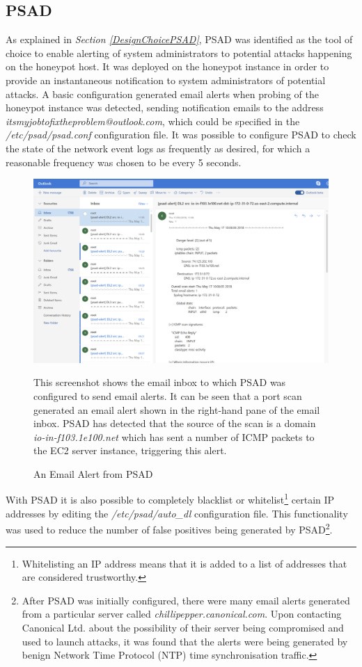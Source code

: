 \subsection{PSAD}
As explained in \textit{Section \ref{DesignChoicePSAD}}, PSAD was identified as the tool of choice to enable alerting of system administrators to potential attacks happening on the honeypot host. It was deployed on the honeypot instance in order to provide an instantaneous notification to system administrators of potential attacks. A basic configuration generated email alerts when probing of the honeypot instance was detected, sending notification emails to the address \textit{itsmyjobtofixtheproblem@outlook.com}, which could be specified in the \textit{/etc/psad/psad.conf} configuration file. It was possible to configure PSAD to check the state of the network event logs as frequently as desired, for which a reasonable frequency was chosen to be every 5 seconds.

\begin{figure}[ht]
      \centering
      \includegraphics[width=160mm, scale=1]{Images/psad-email-alert.PNG}
      \caption{An Email Alert from PSAD} 
      \medskip
      \small
		This screenshot shows the email inbox to which PSAD was configured to send email alerts. It can be seen that a port scan generated an email alert shown in the right-hand pane of the email inbox. PSAD has detected that the source of the scan is a domain \textit{io-in-f103.1e100.net} which has sent a number of ICMP packets to the EC2 server instance, triggering this alert.
\label{fig:psad-email-alert}
\end{figure}

With PSAD it is also possible to completely blacklist or whitelist\footnote{Whitelisting an IP address means that it is added to a list of addresses that are considered trustworthy.} certain IP addresses by editing the \textit{/etc/psad/auto\_dl} configuration file. This functionality was used to reduce the number of false positives being generated by PSAD\footnote{After PSAD was initially configured, there were many email alerts generated from a particular server called \textit{chillipepper.canonical.com}. Upon contacting Canonical Ltd. about the possibility of their server being compromised and used to launch attacks, it was found that the alerts were being generated by benign Network Time Protocol (NTP) time synchronisation traffic.}.

